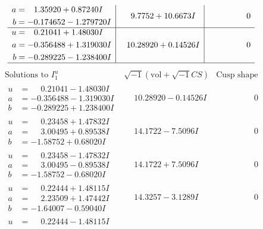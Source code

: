 \documentclass[1p]{elsarticle_modified}
\theoremstyle{definition}
\newcommand{\I}{\sqrt{-1}}
\begin{document}
$$\begin{array}{c|c|c}
\begin{aligned}
a &= \phantom{-}1.35920 + 0.87240 I \\
b &= -0.174652 - 1.279720 I\end{aligned}
 & \phantom{-}9.7752 + 10.6673 I & \phantom{-0.000000 } 0 \\ \hline\begin{aligned}
u &= \phantom{-}0.21041 + 1.48030 I \\
a &= -0.356488 + 1.319030 I \\
b &= -0.289225 - 1.238400 I\end{aligned}
 & \phantom{-}10.28920 + 0.14526 I & \phantom{-0.000000 } 0\\
 \hline 
 \end{array}$$\newpage$$\begin{array}{c|c|c}  
\text{Solutions to }I^u_{1}& \I (\text{vol} + \sqrt{-1}CS) & \text{Cusp shape}\\
 \hline 
\begin{aligned}
u &= \phantom{-}0.21041 - 1.48030 I \\
a &= -0.356488 - 1.319030 I \\
b &= -0.289225 + 1.238400 I\end{aligned}
 & \phantom{-}10.28920 - 0.14526 I & \phantom{-0.000000 } 0 \\ \hline\begin{aligned}
u &= \phantom{-}0.23458 + 1.47832 I \\
a &= \phantom{-}3.00495 + 0.89538 I \\
b &= -1.58752 + 0.68020 I\end{aligned}
 & \phantom{-}14.1722 - 7.5096 I & \phantom{-0.000000 } 0 \\ \hline\begin{aligned}
u &= \phantom{-}0.23458 - 1.47832 I \\
a &= \phantom{-}3.00495 - 0.89538 I \\
b &= -1.58752 - 0.68020 I\end{aligned}
 & \phantom{-}14.1722 + 7.5096 I & \phantom{-0.000000 } 0 \\ \hline\begin{aligned}
u &= \phantom{-}0.22444 + 1.48115 I \\
a &= \phantom{-}2.23509 + 1.47442 I \\
b &= -1.64007 - 0.59040 I\end{aligned}
 & \phantom{-}14.3257 - 3.1289 I & \phantom{-0.000000 } 0 \\ \hline\begin{aligned}
u &= \phantom{-}0.22444 - 1.48115 I \\

\end{aligned}
\end{array}$$
\end{document}
